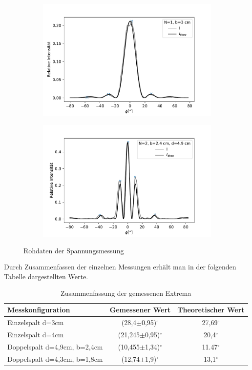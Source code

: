 \documentclass[12pt,a4paper]{article}
\begin{document}
\begin{figure}[H]
	\centering
	\begin{subfigure}{.5\textwidth}
		\centering
		\includegraphics[width=0.9\linewidth]{Rohdaten/Images/einzelspalt_3_3}
	\end{subfigure}%
	\begin{subfigure}{.5\textwidth}
		\centering
		\includegraphics[width=0.9\linewidth]{Rohdaten/Images/doppelspalt_2}
	\end{subfigure}
	\caption{Rohdaten der Spannungsmessung}
	\label{fig:daten_mit_theo}
\end{figure}
Durch Zusammenfassen der einzelnen Messungen erhält man in der folgenden Tabelle dargestellten Werte.\\
\begin{table}[H]
	\centering
	\begin{tabular}{|l|c|c|}
		\hline 
		Messkonfiguration& Gemessener Wert & Theoretischer Wert \\ 
		\hline 
		Einzelspalt d=3cm &(28,4$\pm$0,95)$^\circ$&27,69$^\circ$ \\ 
		\hline 
		Einzelspalt d=4cm &(21,245$\pm$0,95)$^\circ$ &20,4$^\circ$ \\ 
		\hline 
		Doppelspalt d=4,9cm, b=2,4cm&(10,455$\pm$1,34)$^\circ$ &11.47$^\circ$ \\ 
		\hline 
		Doppelspalt d=4,3cm, b=1,8cm&(12,74$\pm$1,9)$^\circ$ &13,1$^\circ$ \\
		\hline 
	\end{tabular}
	\caption{Zusammenfassung der gemessenen Extrema} 
\end{table}
\end{document}
